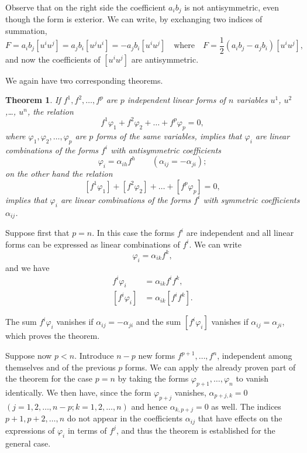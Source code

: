 \documentclass[leqno,11pt]{book}
\numberwithin{equation}{chapter}
\theoremstyle{shape1}
\newtheorem*{thm*}{\hspace{15pt}Theorem}
\theoremstyle{shape0}
\theoremstyle{shape2}
\theoremstyle{definition}
\begin{document}
Observe that on the right side the coefficient $a_{i}b_{j}$ is not antisymmetric, even though the form is exterior. We can write, by exchanging two indices of summation,
\begin{equation}
  \label{eq:5}
  F=a_{i}b_{j}[u^{i}u^{j}]=a_{j}b_{i}[u^{j}u^{i}]=-a_{j}b_{i}[u^{i}u^{j}]\quad\text{where}\quad F=\frac{1}{2}(a_{i}b_{j}-a_{j}b_{i})[u^{i}u^{j}],
\end{equation}
and now the coefficients of $[u^{i}u^{j}]$ are antisymmetric.

We again have two corresponding theorems.
\begin{thm*}
  If $f^{1}, f^{2},\dots,f^{p}$ are $p$ independent linear forms of $n$ variables $u^{1}$, $u^{2}$,\dots, $u^{n}$, the relation
\[
f^{1}\varphi_{1}+f^{2}\varphi_{2}+\dots+f^{p}\varphi_{p}=0,
\]
where $\varphi_{1},\varphi_{2},\dots,\varphi_{p}$ are $p$ forms of the same variables, implies that  $\varphi_{i}$ are  linear combinations of the forms $f^{i}$ with antisymmetric coefficients
\[
\varphi_{i}=\alpha_{ih}f^{h}\qquad(\alpha_{ij}=-\alpha_{ji});
\]
on the other hand the relation
\[
[f^{1}\varphi_{1}]+[f^{2}\varphi_{2}]+\dots+[f^{p}\varphi_{p}]=0,
\]
implies that  $\varphi_{i}$ are  linear combinations of the forms $f^{i}$ with symmetric coefficients $\alpha_{ij}$.
\end{thm*}

Suppose first that $p=n$. In this case the forms $f^{i}$ are independent and all linear forms can be expressed as linear combinations of $f^{i}$. We can write
\[
\varphi_{i}=\alpha_{ik}f^{k},
\]
and we have
\begin{align*}
  f^{i}\varphi_{i}&=\alpha_{ik}f^{i}f^{k},\\
  [f^{i}\varphi_{i}]&=\alpha_{ik}[f^{i}f^{k}].
\end{align*}

The sum $f^{i}\varphi_{i}$ vanishes if $\alpha_{ij}=-\alpha_{ji}$ and the sum $[f^{i}\varphi_{i}]$ vanishes if $\alpha_{ij}=\alpha_{ji}$, which proves the theorem.

Suppose now $p<n$. Introduce $n-p$ new forms $f^{p+1},\dots,f^{n}$, independent among themselves and of the previous $p$ forms. We can apply the already proven part of the theorem for the case $p=n$ by taking the forms $\varphi_{p+1},\dots,\varphi_{n}$ to vanish identically. We then have, since the form $\varphi_{p+j}$ vanishes, $\alpha_{p+j,k}=0$ $(j=1,2,\dots,n-p;k=1,2,\dots,n)$ and hence $\alpha_{k,p+j}=0$ as well. The indices $p+1,p+2,\dots,n$ do not appear in the coefficients $\alpha_{ij}$ that have effects on the expressions of $\varphi_{i}$ in terms of $f^{j}$, and thus the theorem is established for the general case.
\end{document}
